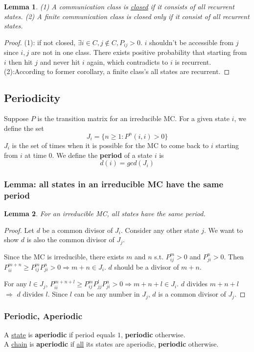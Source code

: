 \documentclass[11pt,a4paper]{article}
\newtheorem{lemma}{Lemma}
\begin{document}
\begin{lemma}
    (1) A communication class is \underline{closed} if it consists of all recurrent states.
    (2) A finite communication class is closed only if it consist of all recurrent states.
\end{lemma}
\begin{proof}
(1): if not closed, $\exists i\in C,j\notin C, P_{ij}>0$. $i$ shouldn't be accessible from $j$ since $i,j$ are not in one class. There exists positive probability that starting from $i$ then hit $j$ and never hit $i$ again, which contradicts to $i$ is recurrent. (2):According to former corollary, a finite class's all states are recurrent.
\end{proof}

\subsection{Periodicity}
Suppose $P$ is the transition matrix for an irreducible MC. For a given state $i$, we define the set $$J_i=\{n\geq 1:P^n(i,i)>0\}$$
$J_i$ is the set of times when it is possible for the MC to come back to $i$ starting from $i$ at time $0$. We define the \textbf{period} of a state $i$ is $$d(i)=gcd(J_i)$$
\subsubsection{Lemma: all states in an irreducible MC have the same period}
\begin{lemma}
    For an irreducible MC, all states have the same period.
\end{lemma}
\begin{proof}
    Let $d$ be a common divisor of $J_i$. Consider any other state $j$. We want to show $d$ is also the common divisor of $J_j$.
    
    Since the MC is irreducible, there exists $m$ and $n$ s.t. $P_{ij}^m>0$ and $P_{ji}^n>0$. Then $P_{ii}^{m+n}\geq P_{ij}^mP_{ji}^n >0 \Rightarrow m+n\in J_i$. $d$ should be a divisor of $m+n$.

    For any $l\in J_j$, $P_{ii}^{m+n+l}\geq P_{ij}^mP_{jj}^lP_{ji}^n >0 \Rightarrow m+n+l\in J_i$. $d$ divides $m+n+l$ $\Rightarrow$ $d$ divides $l$. Since $l$ can be any number in $J_j$, $d$ is a common divisor of $J_j$.
\end{proof}

\subsubsection{Periodic, Aperiodic}
A \underline{state} is \textbf{aperiodic} if period equals $1$, \textbf{periodic} otherwise.\\
A \underline{chain} is \textbf{aperiodic} if \underline{all} its states are aperiodic, \textbf{periodic} otherwise.
\end{document}
